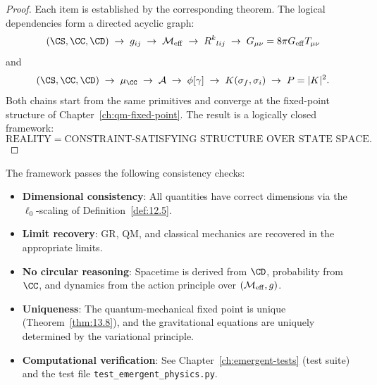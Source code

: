 \begin{proof}
Each item is established by the corresponding theorem.  The logical
dependencies form a directed acyclic graph:
\[
  (\CS, \CC, \CD) \;\to\; g_{ij} \;\to\;
  \CM_{\mathrm{eff}} \;\to\; R^k{}_{lij} \;\to\;
  G_{\mu\nu} = 8\pi G_{\mathrm{eff}} T_{\mu\nu}
\]
and
\[
  (\CS, \CC, \CD) \;\to\; \mu_{\CC} \;\to\;
  \mathcal{A} \;\to\; \phi[\gamma] \;\to\;
  K(\sigma_f, \sigma_i) \;\to\; P = |K|^2.
\]
Both chains start from the same primitives and converge at the
fixed-point structure of Chapter~\ref{ch:qm-fixed-point}.
The result is a logically closed framework:
\[
  \boxed{
  \text{REALITY} = \text{CONSTRAINT-SATISFYING STRUCTURE OVER STATE SPACE}.
  }
\]
\end{proof}

\begin{remark}
The framework passes the following consistency checks:
\begin{itemize}
  \item \textbf{Dimensional consistency}: All quantities have correct
        dimensions via the $\ell_0$-scaling of
        Definition~\ref{def:12.5}.
  \item \textbf{Limit recovery}: GR, QM, and classical mechanics are
        recovered in the appropriate limits.
  \item \textbf{No circular reasoning}: Spacetime is derived from
        $\CD$, probability from $\CC$, and dynamics from the action
        principle over $(\mathcal{M}_{\mathrm{eff}}, g)$.
  \item \textbf{Uniqueness}: The quantum-mechanical fixed point is
        unique (Theorem~\ref{thm:13.8}), and the gravitational
        equations are uniquely determined by the variational principle.
  \item \textbf{Computational verification}: See
        Chapter~\ref{ch:emergent-tests} (test suite) and the test file
        \texttt{test\_emergent\_physics.py}.
\end{itemize}
\end{remark}
